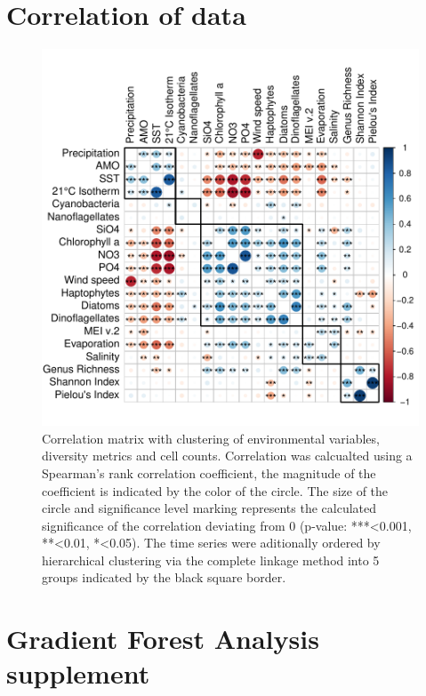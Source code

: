 \documentclass[draft]{agujournal2019}
\begin{document}
\appendix

\section{Correlation of data}


\begin{figure}
\noindent\includegraphics[width=\textwidth]{fig/CorrClustSupplementalPlot_v1.pdf}
\caption{Correlation matrix with clustering of environmental variables, diversity metrics and cell counts. Correlation was calcualted using a Spearman's rank correlation coefficient, the magnitude of the coefficient is indicated by the color of the circle. The size of the circle and significance level marking represents the calculated significance of the correlation deviating from 0 (p-value: ***\textless0.001, **\textless0.01, *\textless0.05). The time series were aditionally ordered by hierarchical clustering via the complete linkage method into 5 groups indicated by the black square border.}
\label{fig:map}
\end{figure}



\section{Gradient Forest Analysis supplement}
\end{document}
